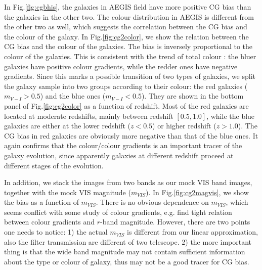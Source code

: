 \documentclass[useAMS,usenatbib]{mn2e}
\begin{document}
In Fig.\ref{fig:cgbhis}, the galaxies in AEGIS field have more
positive CG bias than the galaxies in the other two. The colour
distribution in AEGIS is different from the other two as well, which
suggests the correlation between the CG bias and the colour of the
galaxy. In Fig.\ref{fig:cg2color}, we show the relation between the CG
bias and the colour of the galaxies. The bias is inversely
proportional to the colour of the galaxies. This is consistent with
the trend of total colour \citep[e.g.][]{2010MNRAS.407..144T}: the
bluer galaxies have positive colour gradients, while the redder ones
have negative gradients. Since this marks a possible transition of two
types of galaxies, we split the galaxy sample into two groups
according to their colour: the red galaxies ($m_{V-I}>0.5$) and the
blue ones ($m_{V-I}<0.5$). They are shown in the bottom panel of
Fig.\ref{fig:cg2color} as a function of redshift. Most of the red
galaxies are located at moderate redshifts, mainly between redshift
$[0.5,1.0]$, while the blue galaxies are either at the lower redshift
($z<0.5$) or higher redshift ($z>1.0$). The CG bias in red galaxies
are obviously more negative than that of the blue ones. It again
confirms that the colour/colour gradients is an important tracer of
the galaxy evolution, since apparently galaxies at different redshift
proceed at different stages of the evolution.

In addition, we stack the images from two bands as our mock VIS band
images, together with the mock VIS magnitude ($m_{VIS}$).  In
Fig.\ref{fig:cg2magvis}, we show the bias as a function of
$m_{VIS}$. There is no obvious dependence on $m_{VIS}$, which seems
conflict with some study of colour gradients,
e.g. \citet{2010MNRAS.407..144T} find tight relation between colour
gradients and $r$-band magnitude. However, there are two points one
needs to notice: 1) the actual $m_{VIS}$ is different from our linear
approximation, also the filter transmission are different of two
telescope. 2) the more important thing is that the wide band magnitude
may not contain sufficient information about the type or colour of
galaxy, thus may not be a good tracer for CG bias.
\end{document}
